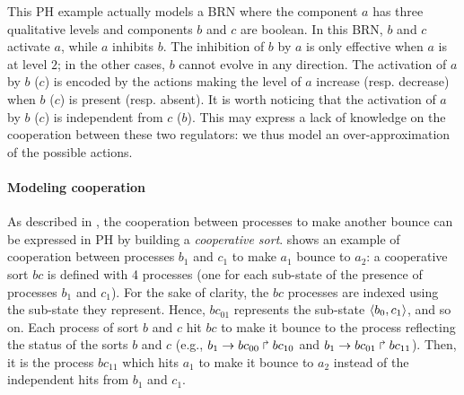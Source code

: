\begin{example*}
This PH example actually models a BRN where the component $a$ has three qualitative
levels and components $b$ and $c$ are boolean.
In this BRN, $b$ and $c$ activate $a$, while $a$ inhibits $b$.
The inhibition of $b$ by $a$ is only effective when $a$ is at level $2$;
in the other cases, $b$ cannot evolve in any direction.
The activation of $a$ by $b$ ($c$) is encoded by the actions making the level of $a$ increase (resp.
decrease) when $b$ ($c$) is present (resp. absent).
It is worth noticing that the activation of $a$ by $b$ ($c$) is independent from $c$ ($b$).
This may express a lack of knowledge on the cooperation between these two regulators:
we thus model an over-approximation of the possible actions.
\end{example*}

\paragraph{Modeling cooperation}
As described in \cite{PMR10-TCSB}, the cooperation between processes to make another bounce can be
expressed in PH by building a \emph{cooperative sort}.
 shows an example of cooperation between processes $b_1$ and $c_1$ to
make $a_1$ bounce to $a_2$:
a cooperative sort $bc$ is defined with 4 processes (one for each sub-state of the presence of
processes $b_1$ and $c_1$).
For the sake of clarity, the $bc$ processes are indexed using the sub-state they represent.
Hence, $bc_{01}$ represents the sub-state $\langle b_0,c_1 \rangle$, and so on.
Each process of sort $b$ and $c$ hit $bc$ to make it bounce to the process reflecting the status of the sorts $b$
and $c$ (e.g., $b_1\rightarrow bc_{00}\Rsh bc_{10}$ and $b_1\rightarrow bc_{01}\Rsh bc_{11}$).
Then, it is the process $bc_{11}$ which hits $a_1$ to make it bounce to $a_2$ instead of the
independent hits from $b_1$ and $c_1$.

